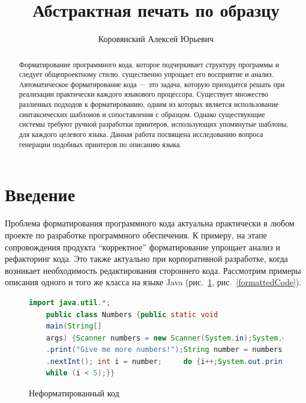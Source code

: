 
\title{Абстрактная печать по образцу}


\author{Коровянский Алексей Юрьевич}



\maketitle             

\begin{abstract}
Форматирование программного кода, которое подчеркивает структуру
программы и следует общепроектному стилю, существенно упрощает
его восприятие и анализ. Автоматическое форматирование кода --- это
задача, которую приходится
решать при реализации практически каждого языкового процессора.
Существует множество различных подходов к форматированию, одним из
которых является использование синтаксических шаблонов и сопоставления
с образцом. Однако существующие системы требуют ручной разработки
принтеров, использующих упомянутые шаблоны, для каждого целевого языка.
Данная работа посвящена исследованию вопроса генерации подобных
принтеров по описанию языка.
\end{abstract}

\section*{Введение}
Проблема форматирования программного кода актуальна практически в любом проекте по разработке программного обеспечения. К примеру, на этапе сопровождения продукта ``корректное'' форматирование упрощает анализ и рефакторинг кода. Это также актуально при корпоративной разработке, когда возникает необходимость редактирования стороннего кода. Рассмотрим примеры описания одного и того же класса на языке Java (рис.~\ref{uglyCode}, рис.~\ref{formattedCode}).

\setlength{\belowcaptionskip}{-10pt}

\begin{figure}[ht]
  \begin{lstlisting}[language=Java]
    import java.util.*;
    public class Numbers {public static void
    main(String[] 
    args) {Scanner numbers = new Scanner(System.in);System.out
    .print("Give me more numbers!");String number = numbers
    .nextInt(); int i = number;     do {i++;System.out.print(i + " ");} 
    while (i < 5);}}
  \end{lstlisting}
\caption{Неформатированный код}    
\label{uglyCode}
\end{figure}

